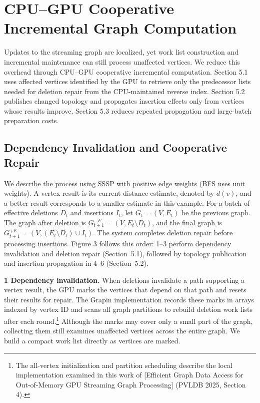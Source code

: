 \section{CPU–GPU Cooperative Incremental Graph Computation}

Updates to the streaming graph are localized, yet work list construction and incremental maintenance can still process unaffected vertices. We reduce this overhead through CPU–GPU cooperative incremental computation. Section 5.1 uses affected vertices identified by the GPU to retrieve only the predecessor lists needed for deletion repair from the CPU-maintained reverse index. Section 5.2 publishes changed topology and propagates insertion effects only from vertices whose results improve. Section 5.3 reduces repeated propagation and large-batch preparation costs.

\subsection{Dependency Invalidation and Cooperative Repair}

We describe the process using SSSP with positive edge weights (BFS uses unit weights). A vertex result is its current distance estimate, denoted by $d(v)$, and a better result corresponds to a smaller estimate in this example. For a batch of effective deletions $D_t$ and insertions $I_t$, let $G_t=(V,E_t)$ be the previous graph. The graph after deletion is $G_{t+1}^{-E}=(V,E_t\setminus D_t)$, and the final graph is $G_{t+1}^{+E}=(V,(E_t\setminus D_t)\cup I_t)$. The system completes deletion repair before processing insertions. Figure 3 follows this order: 1–3 perform dependency invalidation and deletion repair (Section~5.1), followed by topology publication and insertion propagation in 4–6 (Section~5.2).

\textbf{1 Dependency invalidation.} When deletions invalidate a path supporting a vertex result, the GPU marks the vertices that depend on that path and resets their results for repair. The Grapin implementation records these marks in arrays indexed by vertex ID and scans all graph partitions to rebuild deletion work lists after each round.\footnote{The all-vertex initialization and partition scheduling describe the local implementation examined in this work of [Efficient Graph Data Access for Out-of-Memory GPU Streaming Graph Processing] (PVLDB 2025, Section 4).} Although the marks may cover only a small part of the graph, collecting them still examines unaffected vertices across the entire graph. We build a compact work list directly as vertices are marked.


